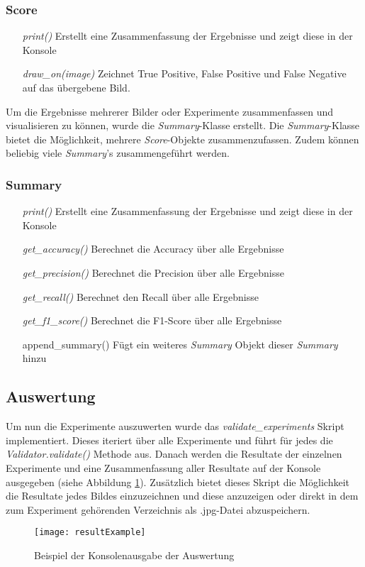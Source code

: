 \subsubsection{Score}

\begin{itemize}[leftmargin=*,labelindent=3cm, labelsep=1cm]
	\item[\textit{print()}] Erstellt eine Zusammenfassung der Ergebnisse und zeigt diese in der Konsole
	\item[\textit{draw\_on(image)}] Zeichnet True Positive, False Positive und False Negative auf das übergebene Bild.
\end{itemize}

\noindent
Um die Ergebnisse mehrerer Bilder oder Experimente zusammenfassen und visualisieren zu können, wurde die \textit{Summary}-Klasse erstellt. Die \textit{Summary}-Klasse bietet die Möglichkeit, mehrere \textit{Score}-Objekte zusammenzufassen. Zudem können beliebig viele \textit{Summary}'s zusammengeführt werden.

\subsubsection{Summary}

\begin{itemize}[leftmargin=*,labelindent=3cm, labelsep=1cm]
	\item[\textit{print()}] Erstellt eine Zusammenfassung der Ergebnisse und zeigt diese in der Konsole
	\item[\textit{get\_accuracy()}] Berechnet die Accuracy über alle Ergebnisse
	\item[\textit{get\_precision()}] Berechnet die Precision über alle Ergebnisse
	\item[\textit{get\_recall()}] Berechnet den Recall über alle Ergebnisse
	\item[\textit{get\_f1\_score()}] Berechnet die F1-Score über alle Ergebnisse
	\item[append\_summary()] Fügt ein weiteres \textit{Summary} Objekt dieser \textit{Summary} hinzu
\end{itemize}

\subsection{Auswertung}

Um nun die Experimente auszuwerten wurde das \textit{validate\_experiments} Skript implementiert. Dieses iteriert über alle Experimente und führt für jedes die \textit{Validator.validate()} Methode aus. Danach werden die Resultate der einzelnen Experimente und eine Zusammenfassung aller Resultate auf der Konsole ausgegeben (siehe Abbildung \ref{fig:resultExample}). Zusätzlich bietet dieses Skript die Möglichkeit die Resultate jedes Bildes einzuzeichnen und diese anzuzeigen oder direkt in dem zum Experiment gehörenden Verzeichnis als .jpg-Datei abzuspeichern.\\


\begin{figure}[H]
	\centering
	\texttt{[image: resultExample]}
	\caption{Beispiel der Konsolenausgabe der Auswertung}
	\label{fig:resultExample}
\end{figure}
